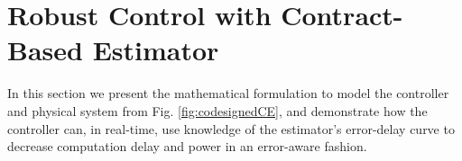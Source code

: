 \section{Robust Control with Contract-Based Estimator}
\label{controlProblem}
In this section we present the mathematical formulation to model the controller and physical system from Fig. \ref{fig:codesignedCE}, and demonstrate how the controller can, in real-time, use knowledge of the estimator's error-delay curve to decrease computation delay and power in an error-aware fashion.


